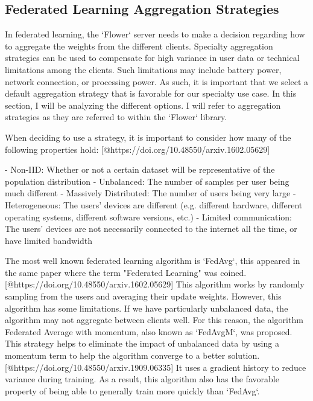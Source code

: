 \documentclass[manuscript,screen,review]{acmart}
\begin{document}
\subsection{Federated Learning Aggregation Strategies}

In federated learning, the `Flower` server needs to make a decision regarding how to aggregate the weights from the different clients. Specialty aggregation strategies can be used to compensate for high variance in user data or technical limitations among the clients. Such limitations may include battery power, network connection, or processing power. As such, it is important that we select a default aggregation strategy that is favorable for our specialty use case. In this section, I will be analyzing the different options. I will refer to aggregation strategies as they are referred to within the `Flower` library.

When deciding to use a strategy, it is important to consider how many of the following properties hold: [@https://doi.org/10.48550/arxiv.1602.05629]

- Non-IID: Whether or not a certain dataset will be representative of the population distribution
- Unbalanced: The number of samples per user being much different
- Massively Distributed: The number of users being very large
- Heterogeneous: The users' devices are different (e.g. different hardware, different operating systems, different software versions, etc.)
- Limited communication: The users' devices are not necessarily connected to the internet all the time, or have limited bandwidth

The most well known federated learning algorithm is `FedAvg`, this appeared in the same paper where the term "Federated Learning" was coined.[@https://doi.org/10.48550/arxiv.1602.05629] This algorithm works by randomly sampling from the users and averaging their update weights. However, this algorithm has some limitations. If we have particularly unbalanced data, the algorithm may not aggregate between clients well. For this reason, the algorithm Federated Average with momentum, also known as `FedAvgM`, was proposed. This strategy helps to eliminate the impact of unbalanced data by using a momentum term to help the algorithm converge to a better solution. [@https://doi.org/10.48550/arxiv.1909.06335] It uses a gradient history to reduce variance during training. As a result, this algorithm also has the favorable property of being able to generally train more quickly than `FedAvg`.
\end{document}
